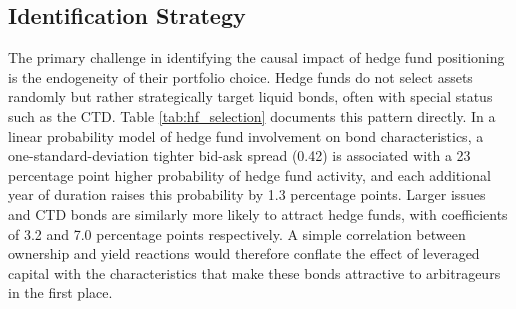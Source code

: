 \documentclass[english, 11pt, oneside]{article}
\begin{document}
\subsection{Identification Strategy}
\label{sec:identification}
The primary challenge in identifying the causal impact of hedge fund positioning is the endogeneity of their portfolio choice. Hedge funds do not select assets randomly but rather strategically target liquid bonds, often with special status such as the CTD. Table \ref{tab:hf_selection} documents this pattern directly. In a linear probability model of hedge fund involvement on bond characteristics, a one-standard-deviation tighter bid-ask spread (0.42) is associated with a 23 percentage point higher probability of hedge fund activity, and each additional year of duration raises this probability by 1.3 percentage points. Larger issues and CTD bonds are similarly more likely to attract hedge funds, with coefficients of 3.2 and 7.0 percentage points respectively. A simple correlation between ownership and yield reactions would therefore conflate the effect of leveraged capital with the characteristics that make these bonds attractive to arbitrageurs in the first place.
\end{document}
